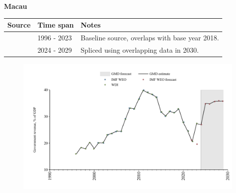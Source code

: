 \documentclass[12pt,a4paper,landscape]{article}
\begin{document}
\begin{adjustbox}{max totalsize={\paperwidth}{\paperheight},center}
\begin{minipage}[t][\textheight][t]{\textwidth}
\vspace*{0.5cm}
{}
\begin{center}
{\Large\bfseries Macau}
\end{center}
\vspace{0.5cm}
\begin{table}[H]
\centering
\small
\begin{tabular}{|l|l|l|}
\hline
\textbf{Source} & \textbf{Time span} & \textbf{Notes} \\
\hline
\rowcolor{white}\cite{WDI}& 1996 - 2023 &Baseline source, overlaps with base year 2018.\\
\rowcolor{lightgray}\cite{IMF_WEO_forecast}& 2024 - 2029 &Spliced using overlapping data in 2030.\\
\hline
\end{tabular}
\end{table}
\begin{figure}[H]
\centering
\includegraphics[width=\textwidth,height=0.6\textheight,keepaspectratio]{graphs/MAC_govrev_GDP.pdf}
\end{figure}
\end{minipage}
\end{adjustbox}
\end{document}

